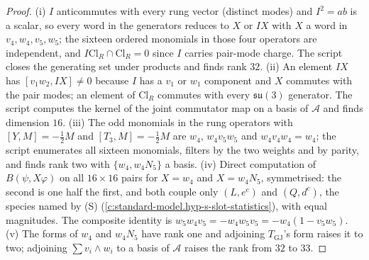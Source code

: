 \documentclass[11pt]{article}
\theoremstyle{definition}
\theoremstyle{plain}
\providecommand{\Cl}{}\renewcommand{\Cl}{\mathrm{Cl}}
\providecommand{\su}{}\renewcommand{\su}{\mathfrak{su}}
\begin{document}
\begin{proof}
(i) $I$ anticommutes with every rung vector (distinct modes) and $I^{2} = ab$ is a scalar, so every word in the generators reduces to $X$ or $IX$ with $X$ a word in $v_{4}, w_{4}, v_{5}, w_{5}$; the sixteen ordered monomials in those four operators are independent, and $I\Cl_{R} \cap \Cl_{R} = 0$ since $I$ carries pair-mode charge. The script closes the generating set under products and finds rank $32$. (ii) An element $IX$ has $[v_{1}w_{2}, IX] \ne 0$ because $I$ has a $v_{1}$ or $w_{1}$ component and $X$ commutes with the pair modes; an element of $\Cl_{R}$ commutes with every $\su(3)$ generator. The script computes the kernel of the joint commutator map on a basis of $\mathcal{A}$ and finds dimension $16$. (iii) The odd monomials in the rung operators with $[Y, M] = -\tfrac12 M$ and $[T_{3}, M] = -\tfrac12 M$ are $w_{4}$, $w_{4}v_{5}w_{5}$ and $w_{4}v_{4}w_{4} = w_{4}$; the script enumerates all sixteen monomials, filters by the two weights and by parity, and finds rank two with $\{w_{4}, w_{4}N_{5}\}$ a basis. (iv) Direct computation of $B(\psi, X\varphi)$ on all $16 \times 16$ pairs for $X = w_{4}$ and $X = w_{4}N_{5}$, symmetrised: the second is one half the first, and both couple only $(L, e^{c})$ and $(Q, d^{c})$, the species named by (S) (\ref{c:standard-model.hyp-s-slot-statistics}), with equal magnitudes. The composite identity is $w_{5}w_{4}v_{5} = -w_{4}w_{5}v_{5} = -w_{4}(1 - v_{5}w_{5})$. (v) The forms of $w_{4}$ and $w_{4}N_{5}$ have rank one and adjoining $T_{\mathrm{GJ}}$'s form raises it to two; adjoining $\sum v_{i} \wedge w_{i}$ to a basis of $\mathcal{A}$ raises the rank from $32$ to $33$.

\end{proof}
\end{document}
